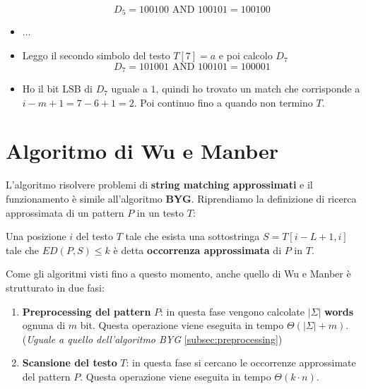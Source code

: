 \begin{esempio}
\begin{itemize}
              \begin{equation}
                  D_5 = 100100 \text{ AND } 100101 = 100100
              \end{equation}
        \item $\dots$
        \item Leggo il secondo simbolo del testo $T[7] = a$ e poi calcolo $D_7$
              \begin{equation}
                  D_7 = 101001 \text{ AND } 100101 = 100001
              \end{equation}
        \item Ho il bit LSB di $D_7$ uguale a $1$, quindi ho trovato un match che
              corrisponde a $i - m + 1 = 7 - 6 + 1 = 2$. Poi continuo fino a
              quando non termino $T$.
    \end{itemize}
\end{esempio}
\section{Algoritmo di Wu e Manber}
L'algoritmo risolvere problemi di \textbf{string matching approssimati} e il
funzionamento è simile all'algoritmo \textbf{BYG}.
Riprendiamo la definizione di ricerca approssimata di un pattern $P$ in un testo
$T$:
\begin{definizione}
    Una posizione $i$ del testo $T$ tale che esista una sottostringa $S = T[i -
                L + 1, i]$ tale che $ED(P, S) \leq k$ è detta \textbf{occorrenza
        approssimata} di $P$ in $T$.
\end{definizione}
Come gli algoritmi visti fino a questo momento, anche quello di Wu e Manber è
strutturato in due fasi:
\begin{enumerate}
    \item \textbf{Preprocessing del pattern} $P$: in questa fase vengono calcolate
          $|\Sigma|$ \textbf{words} ognuna di $m$ bit. Questa operazione viene
          eseguita in tempo $\Theta(|\Sigma| + m)$. (\textit{Uguale a quello
              dell'algoritmo BYG} \ref{subsec:preprocessing})
    \item \textbf{Scansione del testo} $T$: in questa fase si cercano le occorrenze
          approssimate del pattern $P$. Questa operazione viene eseguita in
          tempo $\Theta(k \cdot n)$.
\end{enumerate}
